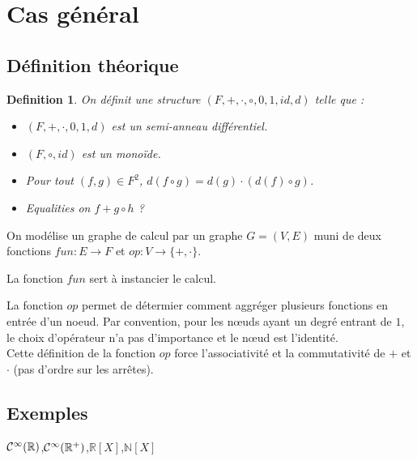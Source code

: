 \documentclass[11pt,a4paper]{article}
\newcommand{\R}{\ensuremath{\mathbb{R}}}
\newtheorem{definition}{Definition}
\begin{document}
\section{Cas général}

	\subsection{Définition théorique}

	\begin{definition}
	
	On définit une structure $(F,+,\cdot,\circ,0,1,id,d)$ telle que :
		
		\begin{itemize}
			
			\item $(F,+,\cdot,0,1,d)$ est un semi-anneau différentiel.
			
			\item $(F,\circ,id)$ est un monoïde.
			
			\item Pour tout $(f,g) \in F^2$, $d(f \circ  g) = d(g) \cdot (d(f) \circ g)$.
			
			\item Equalities on $f + g \circ h$ ?
			
		\end{itemize}			
	
	\end{definition}
	
	On modélise un graphe de calcul par un graphe $G=(V,E)$ muni de deux fonctions $fun : E \to F$ et $op : V \to \{+,\cdot\}$.
	
	La fonction $fun$ sert à instancier le calcul.
	
	La fonction $op$ permet de détermier comment aggréger plusieurs fonctions en entrée d'un noeud. Par convention, pour les n\oe uds ayant un degré entrant de $1$, le choix d'opérateur n'a pas d'importance et le n\oe ud est l'identité.\\
	
	Cette définition de la fonction $op$ force l'associativité et la commutativité de $+$ et $\cdot$ (pas d'ordre sur les arrêtes).
	
	\subsection{Exemples}
	
	$\cal{C}^\infty (\R)$,$\cal{C}^\infty (\R^+)$,$\mathbb{R}[X]$,$\mathbb{N}[X]$
	
\end{document}

